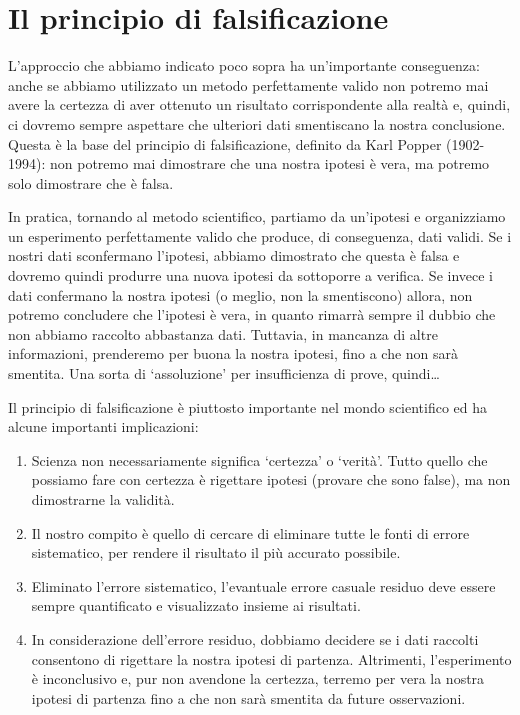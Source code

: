 \documentclass[
  12pt,
]{book}
\providecommand{\tightlist}{%
  \setlength{\itemsep}{0pt}\setlength{\parskip}{0pt}}
\begin{document}
\hypertarget{il-principio-di-falsificazione}{%
\section{Il principio di falsificazione}\label{il-principio-di-falsificazione}}

L'approccio che abbiamo indicato poco sopra ha un'importante conseguenza: anche se abbiamo utilizzato un metodo perfettamente valido non potremo mai avere la certezza di aver ottenuto un risultato corrispondente alla realtà e, quindi, ci dovremo sempre aspettare che ulteriori dati smentiscano la nostra conclusione. Questa è la base del principio di falsificazione, definito da Karl Popper (1902-1994): non potremo mai dimostrare che una nostra ipotesi è vera, ma potremo solo dimostrare che è falsa.

In pratica, tornando al metodo scientifico, partiamo da un'ipotesi e organizziamo un esperimento perfettamente valido che produce, di conseguenza, dati validi. Se i nostri dati sconfermano l'ipotesi, abbiamo dimostrato che questa è falsa e dovremo quindi produrre una nuova ipotesi da sottoporre a verifica. Se invece i dati confermano la nostra ipotesi (o meglio, non la smentiscono) allora, non potremo concludere che l'ipotesi è vera, in quanto rimarrà sempre il dubbio che non abbiamo raccolto abbastanza dati. Tuttavia, in mancanza di altre informazioni, prenderemo per buona la nostra ipotesi, fino a che non sarà smentita. Una sorta di `assoluzione' per insufficienza di prove, quindi\ldots{}

Il principio di falsificazione è piuttosto importante nel mondo scientifico ed ha alcune importanti implicazioni:

\begin{enumerate}
\def\labelenumi{\arabic{enumi}.}
\tightlist
\item
  Scienza non necessariamente significa `certezza' o `verità'. Tutto quello che possiamo fare con certezza è rigettare ipotesi (provare che sono false), ma non dimostrarne la validità.
\item
  Il nostro compito è quello di cercare di eliminare tutte le fonti di errore sistematico, per rendere il risultato il più accurato possibile.
\item
  Eliminato l'errore sistematico, l'evantuale errore casuale residuo deve essere sempre quantificato e visualizzato insieme ai risultati.
\item
  In considerazione dell'errore residuo, dobbiamo decidere se i dati raccolti consentono di rigettare la nostra ipotesi di partenza. Altrimenti, l'esperimento è inconclusivo e, pur non avendone la certezza, terremo per vera la nostra ipotesi di partenza fino a che non sarà smentita da future osservazioni.
\end{enumerate}
\end{document}
